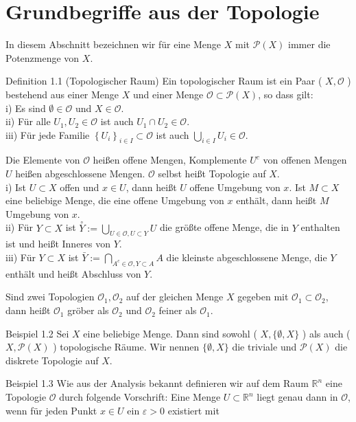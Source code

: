\documentclass[10pt, letterpaper]{article}
\begin{document}
\section {Grundbegriffe aus der Topologie}
In diesem Abschnitt bezeichnen wir für eine Menge $X$ mit $\mathcal{P}(X)$ immer die Potenzmenge von $X$.

Definition 1.1 (Topologischer Raum) Ein topologischer Raum ist ein Paar ( $X, \mathcal{O}$ ) bestehend aus einer Menge $X$ und einer Menge $\mathcal{O} \subset \mathcal{P}(X)$, so dass gilt:\\
i) Es sind $\emptyset \in \mathcal{O}$ und $X \in \mathcal{O}$.\\
ii) Für alle $U_{1}, U_{2} \in \mathcal{O}$ ist auch $U_{1} \cap U_{2} \in \mathcal{O}$.\\
iii) Für jede Familie $\left\{U_{i}\right\}_{i \in I} \subset \mathcal{O}$ ist auch $\bigcup_{i \in I} U_{i} \in \mathcal{O}$.

Die Elemente von $\mathcal{O}$ heißen offene Mengen, Komplemente $U^{c}$ von offenen Mengen $U$ heißen abgeschlossene Mengen. $\mathcal{O}$ selbst heißt Topologie auf $X$.\\
i) Ist $U \subset X$ offen und $x \in U$, dann heißt $U$ offene Umgebung von $x$. Ist $M \subset X$ eine beliebige Menge, die eine offene Umgebung von $x$ enthält, dann heißt $M$ Umgebung von $x$.\\
ii) Für $Y \subset X$ ist $\stackrel{\circ}{Y}:=\bigcup_{U \in \mathcal{O}, U \subset Y} U$ die größte offene Menge, die in $Y$ enthalten ist und heißt Inneres von $Y$.\\
iii) Für $Y \subset X$ ist $\bar{Y}:=\bigcap_{A^{c} \in \mathcal{O}, Y \subset A} A$ die kleinste abgeschlossene Menge, die $Y$ enthält und heißt Abschluss von $Y$.

Sind zwei Topologien $\mathcal{O}_{1}, \mathcal{O}_{2}$ auf der gleichen Menge $X$ gegeben mit $\mathcal{O}_{1} \subset \mathcal{O}_{2}$, dann heißt $\mathcal{O}_{1}$ gröber als $\mathcal{O}_{2}$ und $\mathcal{O}_{2}$ feiner als $\mathcal{O}_{1}$.

Beispiel 1.2 Sei $X$ eine beliebige Menge. Dann sind sowohl ( $X,\{\emptyset, X\}$ ) als auch ( $X, \mathcal{P}(X)$ ) topologische Räume. Wir nennen $\{\emptyset, X\}$ die triviale und $\mathcal{P}(X)$ die diskrete Topologie auf $X$.

Beispiel 1.3 Wie aus der Analysis bekannt definieren wir auf dem Raum $\mathbb{R}^{n}$ eine Topologie $\mathcal{O}$ durch folgende Vorschrift: Eine Menge $U \subset \mathbb{R}^{n}$ liegt genau dann in $\mathcal{O}$, wenn für jeden Punkt $x \in U$ ein $\varepsilon>0$ existiert mit
\end{document}
